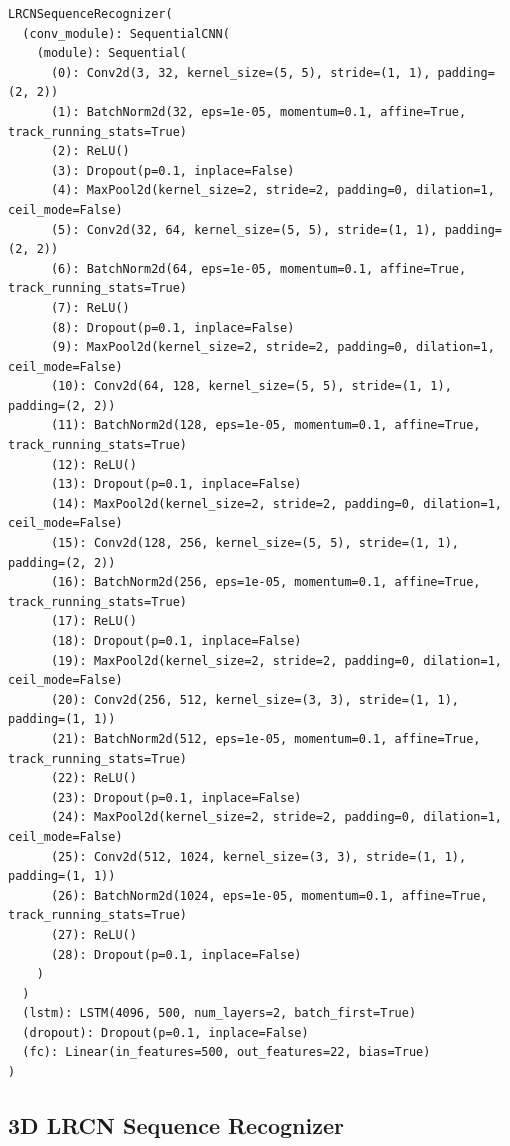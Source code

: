 \documentclass[10pt,twocolumn,letterpaper]{article}
\begin{document}
{
\footnotesize
\begin{verbatim}
LRCNSequenceRecognizer(
  (conv_module): SequentialCNN(
    (module): Sequential(
      (0): Conv2d(3, 32, kernel_size=(5, 5), stride=(1, 1), padding=(2, 2))
      (1): BatchNorm2d(32, eps=1e-05, momentum=0.1, affine=True, track_running_stats=True)
      (2): ReLU()
      (3): Dropout(p=0.1, inplace=False)
      (4): MaxPool2d(kernel_size=2, stride=2, padding=0, dilation=1, ceil_mode=False)
      (5): Conv2d(32, 64, kernel_size=(5, 5), stride=(1, 1), padding=(2, 2))
      (6): BatchNorm2d(64, eps=1e-05, momentum=0.1, affine=True, track_running_stats=True)
      (7): ReLU()
      (8): Dropout(p=0.1, inplace=False)
      (9): MaxPool2d(kernel_size=2, stride=2, padding=0, dilation=1, ceil_mode=False)
      (10): Conv2d(64, 128, kernel_size=(5, 5), stride=(1, 1), padding=(2, 2))
      (11): BatchNorm2d(128, eps=1e-05, momentum=0.1, affine=True, track_running_stats=True)
      (12): ReLU()
      (13): Dropout(p=0.1, inplace=False)
      (14): MaxPool2d(kernel_size=2, stride=2, padding=0, dilation=1, ceil_mode=False)
      (15): Conv2d(128, 256, kernel_size=(5, 5), stride=(1, 1), padding=(2, 2))
      (16): BatchNorm2d(256, eps=1e-05, momentum=0.1, affine=True, track_running_stats=True)
      (17): ReLU()
      (18): Dropout(p=0.1, inplace=False)
      (19): MaxPool2d(kernel_size=2, stride=2, padding=0, dilation=1, ceil_mode=False)
      (20): Conv2d(256, 512, kernel_size=(3, 3), stride=(1, 1), padding=(1, 1))
      (21): BatchNorm2d(512, eps=1e-05, momentum=0.1, affine=True, track_running_stats=True)
      (22): ReLU()
      (23): Dropout(p=0.1, inplace=False)
      (24): MaxPool2d(kernel_size=2, stride=2, padding=0, dilation=1, ceil_mode=False)
      (25): Conv2d(512, 1024, kernel_size=(3, 3), stride=(1, 1), padding=(1, 1))
      (26): BatchNorm2d(1024, eps=1e-05, momentum=0.1, affine=True, track_running_stats=True)
      (27): ReLU()
      (28): Dropout(p=0.1, inplace=False)
    )
  )
  (lstm): LSTM(4096, 500, num_layers=2, batch_first=True)
  (dropout): Dropout(p=0.1, inplace=False)
  (fc): Linear(in_features=500, out_features=22, bias=True)
)
\end{verbatim}
}

\subsection{3D LRCN Sequence Recognizer}
\end{document}
